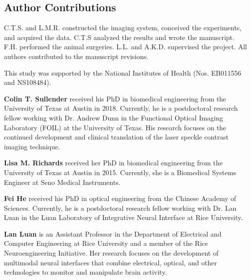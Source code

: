 \documentclass[12pt]{spieman}
\begin{document}
\begin{spacing}{2}
\subsection*{Author Contributions}
C.T.S. and L.M.R. constructed the imaging system, conceived the experiments, and acquired the data. C.T.S analyzed the results and wrote the manuscript. F.H. performed the animal surgeries. L.L. and A.K.D. supervised the project. All authors contributed to the manuscript revisions.

\acknowledgments
This study was supported by the National Institutes of Health (Nos. EB011556 and NS108484).





\vspace{1ex}
\vspace{2ex}\noindent\textbf{Colin T. Sullender} received his PhD in biomedical engineering from the University of Texas at Austin in 2018. Currently, he is a postdoctoral research fellow working with Dr. Andrew Dunn in the Functional Optical Imaging Laboratory (FOIL) at the University of Texas. His research focuses on the continued development and clinical translation of the laser speckle contrast imaging technique.

\vspace{2ex}\noindent\textbf{Lisa M. Richards} received her PhD in biomedical engineering from the University of Texas at Austin in 2015. Currently, she is a Biomedical Systems Engineer at Seno Medical Instruments.

\vspace{2ex}\noindent\textbf{Fei He} received his PhD in optical engineering from the Chinese Academy of Sciences. Currently, he is a postdoctoral research fellow working with Dr. Lan Luan in the Luan Laboratory of Integrative Neural Interface at Rice University.

\vspace{2ex}\noindent\textbf{Lan Luan} is an Assistant Professor in the Department of Electrical and Computer Engineering at Rice University and a member of the Rice Neuroengineering Initiative. Her research focuses on the development of multimodal neural interfaces that combine electrical, optical, and other technologies to monitor and manipulate brain activity.


\end{spacing}
\end{document}
